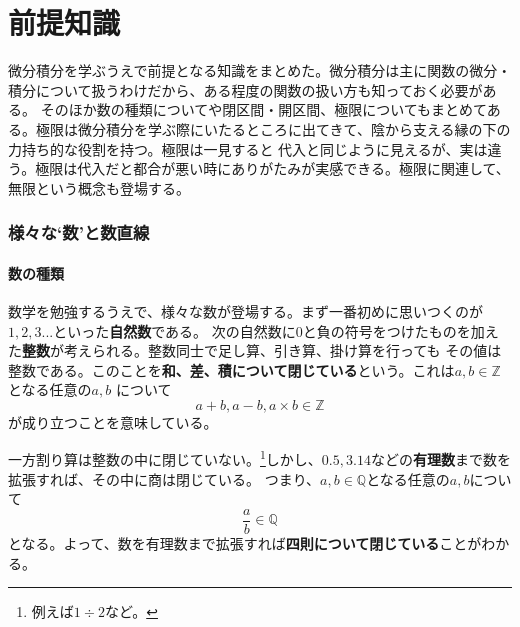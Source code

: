 \documentclass[a4j,dvipdfmx]{jsarticle}
\begin{document}
        
    \clearpage
    \label{目次}
    \tableofcontents
    \clearpage
    
    \part{前提知識}
    \begin{screen}
        微分積分を学ぶうえで前提となる知識をまとめた。微分積分は主に関数の微分・積分について扱うわけだから、ある程度の関数の扱い方も知っておく必要がある。
        そのほか数の種類についてや閉区間・開区間、極限についてもまとめてある。極限は微分積分を学ぶ際にいたるところに出てきて、陰から支える縁の下の力持ち的な役割を持つ。極限は一見すると
        代入と同じように見えるが、実は違う。極限は代入だと都合が悪い時にありがたみが実感できる。極限に関連して、無限という概念も登場する。
    \end{screen}
    \clearpage
    \section{様々な`数'と数直線}

        \subsection{数の種類}
            数学を勉強するうえで、様々な数が登場する。まず一番初めに思いつくのが$1,2,3...$といった\textbf{自然数}である。
            次の自然数に$0$と負の符号をつけたものを加えた\textbf{整数}が考えられる。整数同士で足し算、引き算、掛け算を行っても
            その値は整数である。このことを\textbf{和、差、積について閉じている}という。これは$a,b\in \mathbb{Z}$となる任意の$a,b$
            について
            \begin{equation}
                a+b , a-b , a\times b \in \mathbb{Z}
            \end{equation}
            が成り立つことを意味している。

            一方割り算は整数の中に閉じていない。\footnote{例えば$1\div 2$など。}しかし、$0.5,3.14$などの\textbf{有理数}まで数を拡張すれば、その中に商は閉じている。
            つまり、$a,b \in \mathbb{Q}$となる任意の$a,b$について
            \begin{equation}
                \frac{a}{b} \in \mathbb{Q}
            \end{equation}
            となる。よって、数を有理数まで拡張すれば\textbf{四則について閉じている}ことがわかる。
\end{document}
